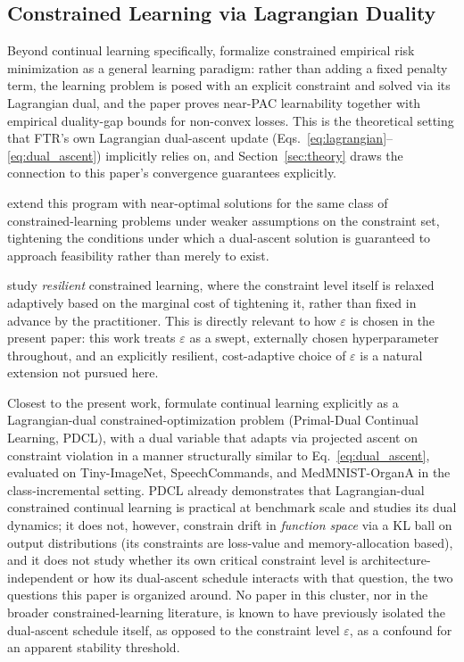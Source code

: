 \documentclass[11pt]{article}
\newcommand{\eps}{\varepsilon}
\begin{document}
\subsection{Constrained Learning via Lagrangian Duality}
\label{sec:lagrangianrelated}
Beyond continual learning specifically, \citet{chamon2023constrained}
formalize constrained empirical risk minimization as a general learning
paradigm: rather than adding a fixed penalty term, the learning problem is
posed with an explicit constraint and solved via its Lagrangian dual, and
the paper proves near-PAC learnability together with empirical duality-gap
bounds for non-convex losses. This is the theoretical setting that FTR's
own Lagrangian dual-ascent update
(Eqs.~\ref{eq:lagrangian}--\ref{eq:dual_ascent}) implicitly relies on, and
Section~\ref{sec:theory} draws the connection to this paper's convergence
guarantees explicitly.

\citet{elenter2024nearoptimal} extend this program with near-optimal
solutions for the same class of constrained-learning problems under
weaker assumptions on the constraint set, tightening the conditions under
which a dual-ascent solution is guaranteed to approach feasibility rather
than merely to exist.

\citet{hounie2023resilient} study \emph{resilient} constrained learning,
where the constraint level itself is relaxed adaptively based on the
marginal cost of tightening it, rather than fixed in advance by the
practitioner. This is directly relevant to how $\eps$ is chosen in the
present paper: this work treats $\eps$ as a swept, externally chosen
hyperparameter throughout, and an explicitly resilient, cost-adaptive
choice of $\eps$ is a natural extension not pursued here.

Closest to the present work, \citet{elenter2023primal} formulate continual
learning explicitly as a Lagrangian-dual constrained-optimization problem
(Primal-Dual Continual Learning, PDCL), with a dual variable that adapts
via projected ascent on constraint violation in a manner structurally
similar to Eq.~\ref{eq:dual_ascent}, evaluated on Tiny-ImageNet,
SpeechCommands, and MedMNIST-OrganA in the class-incremental setting. PDCL
already demonstrates that Lagrangian-dual constrained continual learning is
practical at benchmark scale and studies its dual dynamics; it does not,
however, constrain drift in \emph{function space} via a KL ball on output
distributions (its constraints are loss-value and memory-allocation
based), and it does not study whether its own critical constraint level is
architecture-independent or how its dual-ascent schedule interacts with
that question, the two questions this paper is organized around. No paper
in this cluster, nor in the broader constrained-learning
literature, is known to have previously isolated the dual-ascent schedule itself, as
opposed to the constraint level $\eps$, as a confound for an apparent
stability threshold.
\end{document}
